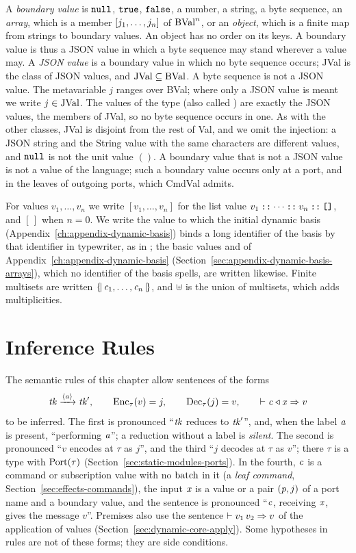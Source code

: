 A \emph{boundary value} is $\mathtt{null}$, $\mathtt{true}$, $\mathtt{false}$, a number, a
string, a byte sequence, an \emph{array}, which is a member
$\mathtt{[}j_1,\ldots,j_n\mathtt{]}$ of $\mathrm{BVal}^n$, or an \emph{object}, which is a
finite map from strings to boundary values. An object has no order on its
keys. %
A boundary value is thus a JSON value in which a byte sequence may stand
wherever a value may. %
A \emph{JSON value} is a boundary value in which no byte sequence occurs; JVal
is the class of JSON values, and $\mathrm{JVal}\subseteq\mathrm{BVal}$. A byte sequence is
not a JSON value. The metavariable $j$ ranges over BVal; where only a JSON value
is meant we write $j\in\mathrm{JVal}$.
The values of the type  (also called
) are exactly the JSON values, the members of JVal, so
no byte sequence occurs in one. %
As with the other classes, JVal is disjoint from the rest of Val, and we omit
the injection: a JSON string and the String value with the same characters are
different values, and $\mathtt{null}$ is not the unit value $()$. A boundary value
that is not a JSON value is not a value of the language; such a boundary value
occurs only at a port, and in the leaves of outgoing ports, which CmdVal
admits.

For values $v_1,\ldots,v_n$ we write $[v_1,\ldots,v_n]$ for the list value
$v_1\mathbin{\textnormal{\texttt{::}}}\cdots\mathbin{\textnormal{\texttt{::}}}v_n\mathbin{\textnormal{\texttt{::}}}\textnormal{\texttt{[]}}$, and
$[\,]$ when $n=0$. We write the value to which the initial dynamic basis
(Appendix~\ref{ch:appendix-dynamic-basis}) binds a long identifier of the
basis by that identifier in typewriter, as in ; the basic
values  and  of
Appendix~\ref{ch:appendix-dynamic-basis}
(Section~\ref{sec:appendix-dynamic-basis-arrays}), which no identifier of the
basis spells, are written likewise. Finite multisets are written $\{\!|\,\mathit{c}_1,\ldots,\mathit{c}_n\,|\!\}$,
and $\uplus$ is the union of multisets, which adds multiplicities.

\section{Inference Rules}\label{sec:effects-rules}

The semantic rules of this chapter allow sentences of the forms
\[
  \mathit{tk}\xrightarrow{\langle \mathit{a}\rangle}\mathit{tk}',\qquad
  \mathrm{Enc}_{\tau}(v)=j,\qquad
  \mathrm{Dec}_{\tau}(j)=v,\qquad
  \vdash \mathit{c} \triangleleft \mathit{x} \Rightarrow v
\]
to be inferred. The first is pronounced ``$\mathit{tk}$ reduces to $\mathit{tk}'$'', and,
when the label $\mathit{a}$ is present, ``performing $\mathit{a}$''; a reduction without
a label is \emph{silent}. The second is pronounced ``$v$ encodes at $\tau$ as
$j$'', and the third ``$j$ decodes at $\tau$ as $v$''; there $\tau$ is a type
with $\mathrm{Port}(\tau)$ (Section~\ref{sec:static-modules-ports}). In the fourth,
$\mathit{c}$ is a command or subscription value with no $\mathrm{batch}$ in it (a
\emph{leaf command}, Section~\ref{sec:effects-commands}), the input $\mathit{x}$ is a
value or a pair $(\mathit{p},j)$ of a port name and a boundary value, and the sentence
is pronounced ``$\mathit{c}$, receiving $\mathit{x}$, gives the message $v$''. Premises also use
the sentence $\vdash v_1\,v_2 \Rightarrow v$ of the application of values
(Section~\ref{sec:dynamic-core-apply}). Some hypotheses in rules are not of
these forms; they are side conditions.

